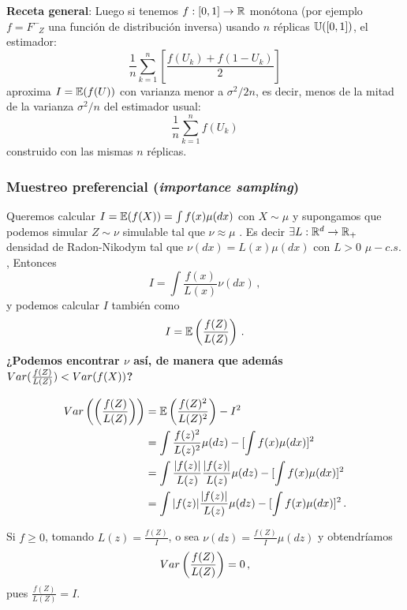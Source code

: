 \textbf{Receta general}: Luego si tenemos $f:[0,1]\to\mathbb{R}$ monótona (por ejemplo $f=F^-_{\mbox{ }Z}$ una función de distribución inversa) usando $n$ réplicas $\mathbb{U}([0,1])$, el estimador: $$\displaystyle\frac{1}{n}\sum^n_{k=1}[\frac{f(U_k)+f(1-U_k)}{2}]$$ aproxima $I=\mathbb{E}(f(U))$ con varianza menor a $\sigma^2/2n$, es decir, menos de la mitad de la varianza $\sigma^2/n$ del estimador usual: $$\displaystyle\frac{1}{n}\sum^n_{k=1}f(U_k)$$ construido con las mismas $n$ réplicas.
\vspace{1cm}\\
\subsubsection{Muestreo preferencial (\textit{importance sampling})}
\label{preferencial}
Queremos calcular $I=\mathbb{E}(f(X))=\int f(x)\mu(dx)$ con $X\sim \mu$ y supongamos que podemos simular $Z\sim\nu$ simulable tal que $\nu\approx\mu$ .  %
Es decir $\exists L:\mathbb{R}^d\to\mathbb{R}_+$ densidad de Radon-Nikodym tal que $\nu(dx)=L(x)\mu(dx)$ con $L>0$ $\mu-c.s.$,
\newline Entonces 
$$I=\displaystyle\int\frac{f(x)}{L(x)}\nu(dx)\, ,$$ 
y podemos calcular $I$ también como 
$$I=\displaystyle\mathbb{E}\left(\frac{f(Z)}{L(Z)}\right) \, .$$
\textbf{¿Podemos encontrar $\nu$ así, de manera que además $Var(\frac{f(Z)}{L(Z)})<Var(f(X))$?}
\begin{remark}
\begin{alignat*}{2}
    Var\left(\displaystyle\left(\frac{f(Z)}{L(Z)}\right)\right) & = \mathbb{E}\left(\frac{f(Z)^2}{L(Z)^2}\right)-I^2\\
     & = \int \frac{f(z)^2}{L(z)^2}\mu(dz) - [\int f(x)\mu(dx)]^2 \\
     & = \int \frac{|f(z)|}{L(z)}\frac{|f(z)|}{L(z)}\mu(dz) - [\int f(x)\mu(dx)]^2 \\
     & = \int |f(z)|\frac{|f(z)|}{L(z)}\mu(dz) - [\int f(x)\mu(dx)]^2 \, .
\end{alignat*}
\end{remark}
Si $f\geq0$, tomando $L(z)=\displaystyle\frac{f(Z)}{I}$, o sea $\nu(dz)=\displaystyle\frac{f(Z)}{I}\mu(dz)$ y obtendríamos 
$$Var\left(\frac{f(Z)}{L(Z)}\right)=0 \, ,$$
pues $\frac{f(Z)}{L(Z)}=I$.
